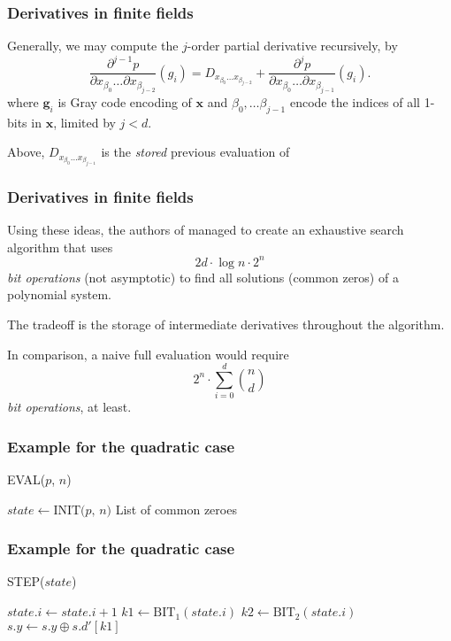 \documentclass{beamer}
\begin{document}
\begin{frame}
    \frametitle{Derivatives in finite fields}
    Generally, we may compute the $j$-order partial derivative recursively, by 
    $$
        \frac{\partial^{j - 1} p}{\partial x_{\beta_0} \dots \partial x_{\beta_{j - 2}}}(g_i) = D_{x_{\beta_0} \dots x_{\beta_{j - 2}}} + \frac{\partial^j p}{\partial x_{\beta_0} \dots \partial x_{\beta_{j - 1}}}(g_i).
    $$
    where $\mathbf{g}_i$ is Gray code encoding of $\mathbf{x}$ and $\beta_0, \dots \beta_{j - 1}$ encode the indices of all 1-bits in $\mathbf{x}$, limited by $j < d$.
    
    Above, $D_{x_{\beta_0} \dots x_{\beta_{j - 1}}}$ is the \textit{stored} previous evaluation of 
\end{frame}

\begin{frame}
    \frametitle{Derivatives in finite fields}
    Using these ideas, the authors of \cite{ches-2010-23990} managed to create an exhaustive search algorithm that uses 
    $$
        2d \cdot \log n \cdot 2^n
    $$
    \textit{bit operations} (not asymptotic) to find all solutions (common zeros) of a polynomial system. 

    The tradeoff is the storage of intermediate derivatives throughout the algorithm.

    In comparison, a naive full evaluation would require 
    $$
        2^n \cdot \sum_{i = 0}^{d} \binom{n}{d}
    $$
    \textit{bit operations}, at least.
\end{frame}

\begin{frame}
    \frametitle{Example for the quadratic case}
    \begin{algorithm}[H]
        \DontPrintSemicolon
        \SetAlgoLined
        \caption{EVAL($p$, $n$)}\label{alg:fes_eval}
        $state \gets \text{INIT($p$, $n$)}$\;
        \Return List of common zeroes
    \end{algorithm}
\end{frame}

\begin{frame}
    \frametitle{Example for the quadratic case}
    \begin{algorithm}[H]
        \DontPrintSemicolon
        \SetAlgoLined
        \caption{STEP($state$)}\label{alg:fes_step}
        $state.i \gets state.i + 1$\;
        $k1 \gets \text{BIT}_1(state.i)$\;
        $k2 \gets \text{BIT}_2(state.i)$\;
        $s.y \gets s.y \oplus s.d'[k1]$\;
    \end{algorithm}
\end{frame}
\end{document}
